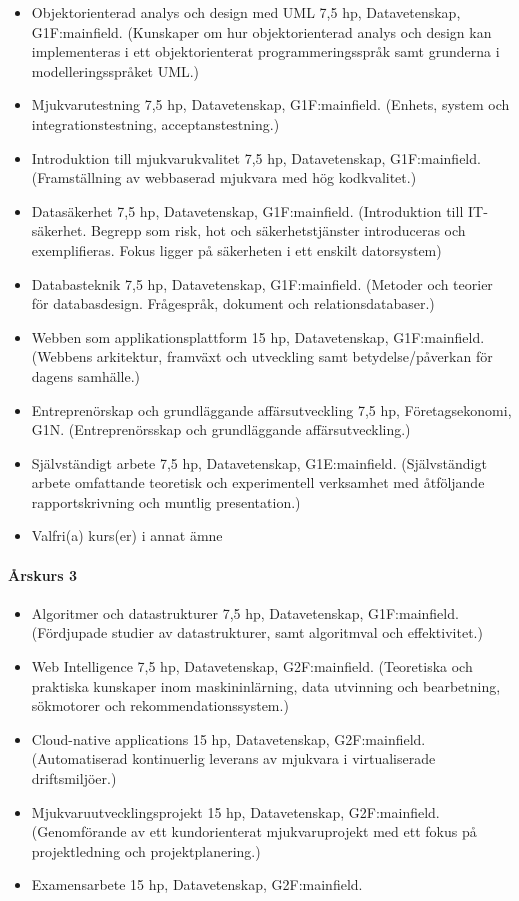 \documentclass[swedish]{LnuCmThesis}
\begin{document}
\begin{itemize}
    \item Objektorienterad analys och design med UML 7,5 hp, Datavetenskap, G1F\fn:mainfield{}. (Kunskaper om hur objektorienterad analys och design kan implementeras i ett objektorienterat programmeringsspråk samt grunderna i modelleringsspråket UML.)
    \item Mjukvarutestning 7,5 hp, Datavetenskap, G1F\fn:mainfield{}. (Enhets­, system­ och integrationstestning, acceptanstestning.)
    \item Introduktion till mjukvarukvalitet 7,5 hp, Datavetenskap, G1F\fn:mainfield{}. (Framställning av webbaserad mjukvara med hög kodkvalitet.)
    \item Datasäkerhet 7,5 hp, Datavetenskap, G1F\fn:mainfield{}. (Introduktion till IT­säkerhet. Begrepp som risk, hot och säkerhetstjänster introduceras och exemplifieras. Fokus ligger på säkerheten i ett enskilt datorsystem)
    \item Databasteknik 7,5 hp, Datavetenskap, G1F\fn:mainfield{}. (Metoder och teorier för databasdesign. Frågespråk, dokument­ och relationsdatabaser.)
    \item Webben som applikationsplattform 15 hp, Datavetenskap, G1F\fn:mainfield{}. (Webbens arkitektur, framväxt och utveckling samt betydelse/påverkan för dagens samhälle.)
    \item Entreprenörskap och grundläggande affärsutveckling 7,5 hp, Företagsekonomi, G1N. (Entreprenörsskap och grundläggande affärsutveckling.)
    \item Självständigt arbete 7,5 hp, Datavetenskap, G1E\fn:mainfield{}. (Självständigt arbete omfattande teoretisk och experimentell verksamhet med åtföljande rapportskrivning och muntlig presentation.)
    \item Valfri(a) kurs(er) i annat ämne
\end{itemize}

\paragraph*{Årskurs 3}

\begin{itemize}
    \item Algoritmer och datastrukturer 7,5 hp, Datavetenskap, G1F\fn:mainfield{}. (Fördjupade studier av datastrukturer, samt algoritmval och effektivitet.)
    \item Web Intelligence 7,5 hp, Datavetenskap, G2F\fn:mainfield{}. (Teoretiska och praktiska kunskaper inom maskininlärning, data utvinning och bearbetning, sökmotorer och rekommendationssystem.)
    \item Cloud-native applications 15 hp, Datavetenskap, G2F\fn:mainfield{}. (Automatiserad kontinuerlig leverans av mjukvara i virtualiserade driftsmiljöer.)
    \item Mjukvaruutvecklingsprojekt 15 hp, Datavetenskap, G2F\fn:mainfield{}. (Genomförande av ett kundorienterat mjukvaruprojekt med ett fokus på projektledning och projektplanering.)
    \item Examensarbete 15 hp, Datavetenskap, G2F\fn:mainfield{}.
\end{itemize}
\end{document}
